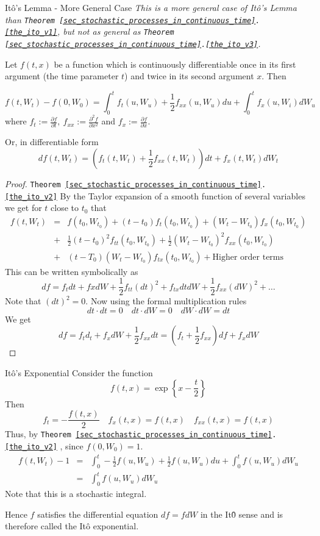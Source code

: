 \documentclass[11pt,a4paper]{article}
\begin{document}
  \begin{theorem}{It\^o's Lemma - More General Case}\label{the_ito_v2}
    \textit{This is a more general case of It\^o's Lemma than \texttt{Theorem \ref{sec_stochastic_processes_in_continuous_time}.\ref{the_ito_v1}}, but not as general as \texttt{Theorem \ref{sec_stochastic_processes_in_continuous_time}.\ref{the_ito_v3}}.}
    \par Let $f(t,x)$ be a function which is continuously differentiable once in its first argument (the time parameter $t$) and twice in its second argument $x$. Then

    \[ f(t,W_t)-f(0,W_0)=\int_0^tf_t(u,W_u)+\frac12 f_{xx}(u,W_u)du +\int_0^tf_x(u,W_i)dW_u\]
    where $f_t:=\frac{\partial f}{\partial t},\ f_{xx}:=\frac{\partial^2 f}{\partial x^2}$ and $f_x:=\frac{\partial f}{\partial x}$.
    \par Or, in differentiable form
    \[ df(t,W_t)=(f_t(t,W_t)+\frac12f_{xx}(t,W_t))dt+f_x(t,W_t)dW_t \]
  \end{theorem}

  \begin{proof}{\texttt{Theorem \ref{sec_stochastic_processes_in_continuous_time}.\ref{the_ito_v2}}}
    By the Taylor expansion of a smooth function of several variables we get for $t$ close to $t_0$ that
    \[\begin{array}{rcl}
      f(t,W_t)&=&f(t_0,W_{t_0})+(t-t_0)f_t(t_0,W_{t_0})+(W_t-W_{t_0})f_x(t_0,W_{t_0})\\
      &+&\frac12(t-t_0)^2f_{tt}(t_0,W_{t_0})+\frac12(W_t-W_{t_0})^2f_{xx}(t_0,W_{t_0})\\
      &+&(t-T_0)(W_t-W_{t_0})f_{tx}(t_0,W_{t_0})+\text{Higher order terms}
    \end{array}\]
    This can be written symbolically as
    \[ df=f_tdt+fxdW+\frac12f_{tt}(dt)^2+f_{tx}dtdW+\frac12f_{xx}(dW)^2+\dots \]
    Note that $(dt)^2=0$. Now using the formal multiplication rules
    \[ dt\cdot dt=0\quad dt\cdot dW=0\quad dW\cdot dW=dt \]
    We get
    \[ df=f_td_t+f_xdW+\frac12f_{xx}dt=(f_t+\frac12f_{xx})df+f_xdW \]
  \end{proof}

  \begin{example}{It\^o's Exponential}
    Consider the function
    \[ f(t,x)=\exp\left\{x-\frac{t}2\right\} \]
    Then
    \[ f_t=-\frac{f(t,x)}2\quad f_x(t,x)=f(t,x)\quad f_{xx}(t,x)=f(t,x) \]
    Thus, by \texttt{Theorem \ref{sec_stochastic_processes_in_continuous_time}.\ref{the_ito_v2}} , since $f(0,W_0)=1$.
    \[\begin{array}{rcl}
      f(t,W_t)-1&=&\int_0^t-\frac12f(u,W_u)+\frac12 f(u,W_u)du+\int_0^tf(u,W_u)dW_u\\
      &=&\int_0^tf(u,W_u)dW_u
    \end{array}\]
    Note that this is a stochastic integral.
    \par Hence $f$ satisfies the differential equation $df=fdW$ in the It\^0 sense and is therefore called the It\^o exponential.
  \end{example}
\end{document}
